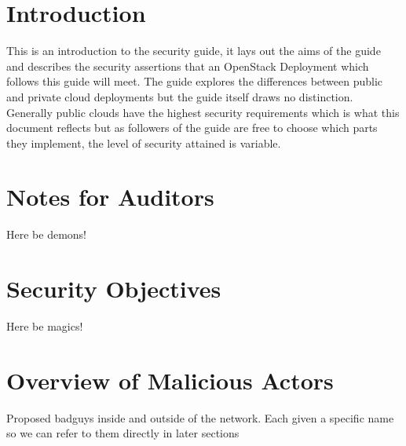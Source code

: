 \section{Introduction}
This is an introduction to the security guide, it lays out the aims of the guide and describes the security assertions that an OpenStack Deployment which follows this guide will meet. The guide explores the differences between public and private cloud deployments but the guide itself draws no distinction. Generally public clouds have the highest security requirements which is what this document reflects but as followers of the guide are free to choose which parts they implement, the level of security attained is variable.
\section{Notes for Auditors}
Here be demons!
\section{Security Objectives}
Here be magics!
\section{Overview of Malicious Actors}
Proposed badguys inside and outside of the network. Each given a specific name so we can refer to them directly in later sections